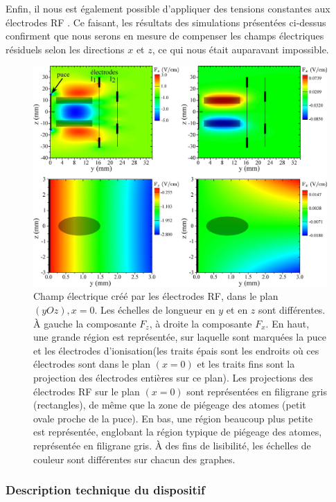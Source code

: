 Enfin, il nous est également possible d'appliquer des tensions constantes aux électrodes \og RF \fg{}.
Ce faisant, les résultats des simulations présentées ci-dessus confirment que nous serons en mesure de compenser les champs électriques résiduels selon les directions $x$ et $z$, ce qui nous était auparavant impossible.


\begin{figure}[h]
\centering
\includegraphics[width=\linewidth]{figures/circulars/simion_4quadrants.jpg}
\caption[Champ électrique créé par les électrodes RF]{
Champ électrique créé par les électrodes RF, dans le plan $(yOz),x=0$. Les échelles de longueur en $y$ et en $z$ sont différentes.
\`A gauche la composante $F_z$, à droite la composante $F_x$.
En haut, une grande région est représentée, sur laquelle sont marquées la puce et les électrodes d'ionisation(les traits épais sont les endroits où ces électrodes sont dans le plan $(x=0)$ et les traits fins sont la projection des électrodes entières sur ce plan). Les projections des électrodes RF sur le plan $(x=0)$ sont représentées en filigrane gris (rectangles), de même que la zone de piégeage des atomes (petit ovale proche de la puce).
En bas, une région beaucoup plus petite est représentée, englobant la région typique de piégeage des atomes, représentée en filigrane gris.
\`A des fins de lisibilité, les échelles de couleur sont différentes sur chacun des graphes.
}
\label{fig:simion_fullregion}
\end{figure}
%


\clearpage
\subsubsection*{Description technique du dispositif}

